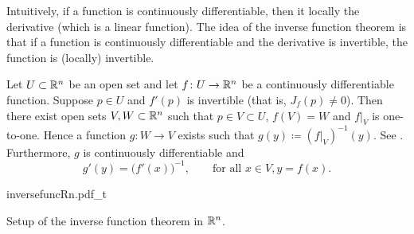 Intuitively, if a function is continuously differentiable, then it
locally  the derivative (which is a linear function).
The idea of the inverse function theorem is that if a function is
continuously differentiable and the derivative is invertible, the function is
(locally) invertible.


\begin{thm}
\label{thm:inverse}
Let $U \subset {\mathbb{R}}^n$ be an open set and let
$f \colon U \to {\mathbb{R}}^n$ be a continuously differentiable function.
Suppose $p \in U$ and $f'(p)$ is invertible
(that is, $J_f(p) \not=0$).
Then there exist open sets $V, W \subset {\mathbb{R}}^n$ such that
$p \in V \subset U$, $f(V) = W$ and $f|_V$ is one-to-one.  
Hence a function $g \colon W \to V$ exists such that
$g(y) \coloneqq (f|_V)^{-1}(y)$.
See .
Furthermore, $g$ is continuously differentiable
and 
\begin{equation*}
g'(y) = {\bigl(f'(x)\bigr)}^{-1}, \qquad \text{for all } x \in V, y = f(x).
\end{equation*}
\end{thm}

\begin{myfigureht}
{inversefuncRn.pdf_t}
\caption{Setup of the inverse function theorem in ${\mathbb{R}}^n$.\label{fig:inversefuncRn}}
\end{myfigureht}

